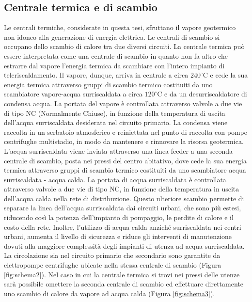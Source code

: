 \documentclass[laurea,oneside,11pt]{USiena_tesiLM}
\begin{document}
\subsection{Centrale termica e di scambio}
Le centrali termiche, considerate in questa tesi, sfruttano il vapore geotermico non idoneo alla generazione di energia elettrica. Le centrali di scambio si occupano dello scambio di calore tra due diversi circuiti. La centrale termica può essere interpretata come una centrale di scambio in quanto non fa altro che estrarre dal vapore l'energia termica da scambiare con l'intero impianto di teleriscaldamento. Il vapore, dunque, arriva in centrale a circa $240 ^{\circ}$C e cede la sua energia termica attraverso gruppi di scambio termico costituiti da uno scambiatore vapore-acqua surriscaldata a circa $120 ^{\circ}$C e da un desurriscaldatore di condensa acqua. La portata del vapore è controllata attraverso  valvole a due vie di tipo NC (Normalmente Chiuse), in funzione della temperatura  di uscita dell'acqua surriscaldata desiderata nel circuito primario. La condensa viene raccolta in un serbatoio atmosferico e reiniettata nel punto di raccolta con pompe centrifughe multistadio, in modo da mantenere e rinnovare la risorsa geotermica. L'acqua surriscaldata viene inviata attraverso una linea feeder a una seconda centrale di scambio, posta nei pressi del centro abitativo, dove cede la sua energia termica attraverso gruppi di scambio termico costituiti da uno scambiatore acqua surriscaldata - acqua calda. La portata di acqua surriscaldata è controllata attraverso valvole a due vie di tipo NC, in funzione della temperatura in uscita dell'acqua calda nella rete di distribuzione. Questo ulteriore scambio permette di separare la linea dell'acqua surriscaldata  dai circuiti urbani, che sono più estesi, riducendo così la potenza dell'impianto di pompaggio, le perdite di calore e il costo della rete. Inoltre, l'utilizzo di acqua calda anziché surriscaldata nei centri urbani, aumenta il livello di sicurezza e riduce gli interventi di manutenzione dovuti alla maggiore complessità degli impianti di utenza ad acqua surriscaldata. La circolazione sia nel circuito primario che secondario sono garantite da elettropompe centrifughe ubicate nella stessa centrale di scambio (Figura \ref{fig:schema2}).
Nel caso in cui la centrale termica si trovi nei pressi delle utenze sarà possibile omettere la seconda centrale di scambio ed effettuare direttamente uno scambio di calore da vapore ad acqua calda (Figura \ref{fig:schema3}).
\end{document}
